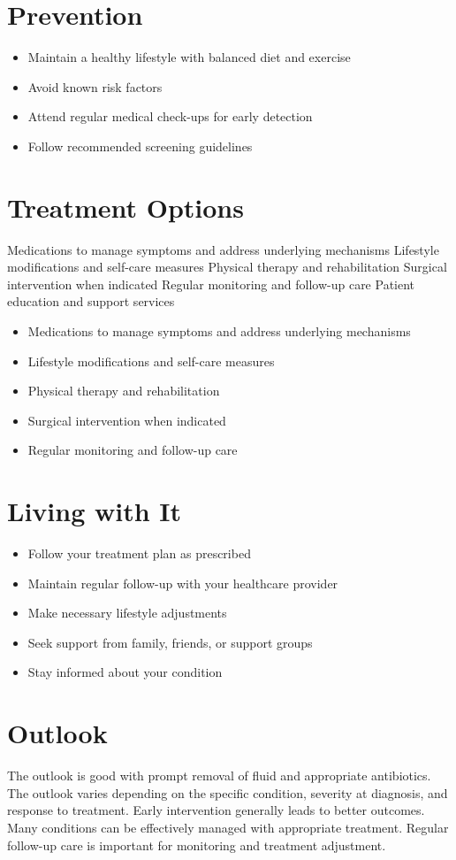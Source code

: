 \section{Prevention}
\begin{itemize}[noitemsep]
  \item Maintain a healthy lifestyle with balanced diet and exercise
  \item Avoid known risk factors
  \item Attend regular medical check-ups for early detection
  \item Follow recommended screening guidelines
\end{itemize}
\section{Treatment Options}
Medications to manage symptoms and address underlying mechanisms Lifestyle modifications and self-care measures Physical therapy and rehabilitation Surgical intervention when indicated Regular monitoring and follow-up care Patient education and support services

\begin{itemize}[noitemsep]
  \item Medications to manage symptoms and address underlying mechanisms
  \item Lifestyle modifications and self-care measures
  \item Physical therapy and rehabilitation
  \item Surgical intervention when indicated
  \item Regular monitoring and follow-up care
\end{itemize}
\section{Living with It}
\begin{itemize}[noitemsep]
  \item Follow your treatment plan as prescribed
  \item Maintain regular follow-up with your healthcare provider
  \item Make necessary lifestyle adjustments
  \item Seek support from family, friends, or support groups
  \item Stay informed about your condition
\end{itemize}
\section{Outlook}
The outlook is good with prompt removal of fluid and appropriate antibiotics. The outlook varies depending on the specific condition, severity at diagnosis, and response to treatment. Early intervention generally leads to better outcomes. Many conditions can be effectively managed with appropriate treatment. Regular follow-up care is important for monitoring and treatment adjustment.
